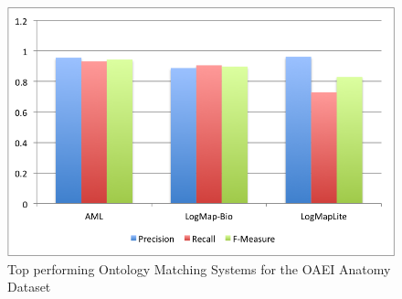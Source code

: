 \documentclass[11pt,titlepage,oneside,openany,a4paper]{report}
\begin{document}
\begin{figure}
 \includegraphics[scale=.5]{figures/oaei/anatomy/top2014.png} 
 \caption{Top performing Ontology Matching Systems for  the OAEI Anatomy Dataset}
 \label{img::oaei_anatomy}
\end{figure}
\end{document}
